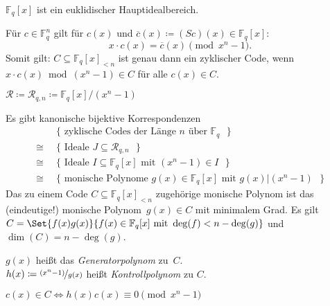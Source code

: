 \documentclass{cheat-sheet}
\newcommand{\F}{\mathbb{F}} %
\newcommand{\divides}{|} %
\begin{document}
\begin{fakt}
  $\F_q[x]$ ist ein euklidischer Hauptidealbereich.
\end{fakt}

\begin{bem}
  Für $c \in \F_q^n$ gilt für $c(x)$ und $ \overline{c}(x) \coloneqq (S c)(x) \in \F_q[x]$:
  \[
    x \cdot c(x) = \overline{c}(x) \pmod{x^n - 1}.
  \]
  Somit gilt: $C \subseteq \F_q[x]_{< n}$ ist genau dann ein zyklischer Code, wenn $x \cdot c(x) \bmod{(x^n - 1)} \in C$ für alle $c(x) \in C$.
\end{bem}


\begin{nota}
  $\mathcal{R} \coloneqq \mathcal{R}_{q,n} \coloneqq \F_q[x] / (x^n - 1)$
\end{nota}

\begin{satz}
  Es gibt kanonische bijektive Korrespondenzen
  \begin{align*}
    & \{ \text{ zyklische Codes der Länge $n$ über $\F_q$ } \} \\
    \cong \enspace & \{ \text{ Ideale $J \subseteq \mathcal{R}_{q,n}$ } \} \\
    \cong \enspace & \{ \text{ Ideale $I \subseteq \F_q[x]$ mit $(x^n - 1) \in I$ } \} \\
    \cong \enspace & \{ \text{ monische Polynome $g(x) \in \F_q[x]$ mit $g(x) \divides (x^n - 1)$ } \}
  \end{align*}
  Das zu einem Code $C \subseteq \F_q[x]_{< n}$ zugehörige monische Polynom ist das (eindeutige!) monische Polynom~$g(x) \in C$ mit minimalem Grad.
  Es gilt $C = \Set{f(x) g(x)}{f(x) \in \F_q[x] \text{ mit } \deg(f) < n - \deg(g)}$ und $\dim(C) = n - \deg(g)$.
\end{satz}

\begin{defn}
  \begin{minipage}[t]{0.8 \linewidth}
    $g(x)$ heißt das \emph{Generatorpolynom} zu~$C$. \\
    $h(x) \coloneqq \nicefrac{(x^n - 1)}{g(x)}$ heißt \emph{Kontrollpolynom} zu $C$.
  \end{minipage}
\end{defn}

\begin{lem}
  $c(x) \in C \iff h(x) c(x) \equiv 0 \pmod{x^n - 1}$
\end{lem}
\end{document}
